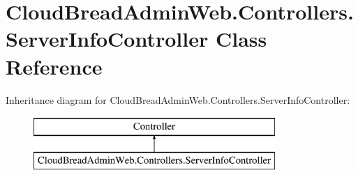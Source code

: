 \hypertarget{a00179}{}\section{Cloud\+Bread\+Admin\+Web.\+Controllers.\+Server\+Info\+Controller Class Reference}
\label{a00179}
Inheritance diagram for Cloud\+Bread\+Admin\+Web.\+Controllers.\+Server\+Info\+Controller\+:\begin{figure}[H]
\begin{center}
\leavevmode
\includegraphics[height=2.000000cm]{a00179}
\end{center}
\end{figure}
